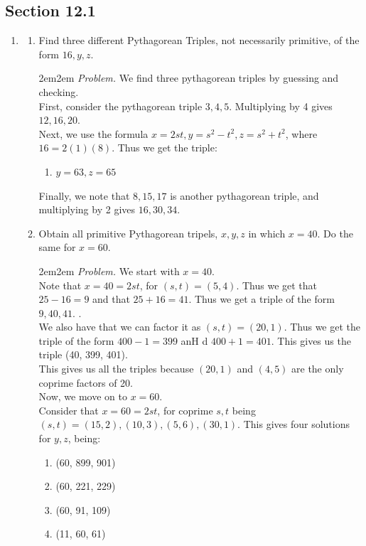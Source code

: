 \documentclass[10pt,oneside]{book}
\newcommand{\gspc}{\vspace{0.13cm}} %
\newcommand{\gline}{\gspc\\} %
\let\endoldproof\endproof
\newenvironment{problem}[1]
  {\vspace{-0.1cm}\begin{coloredadjust}\begin{adjustwidth}{2em}{2em}
   \textit{Problem. }#1}
  {\endoldproof
\end{adjustwidth}\end{coloredadjust}\gspc}
\begin{document}
\newcommand{\cg}[1]{\color{OliveGreen}#1\color{white}}
\newcommand{\cb}[1]{\color{BlueViolet}#1\color{white}}

\subsection*{Section 12.1}
\begin{enumerate}
  \item \begin{enumerate}
    \item Find three different Pythagorean Triples, not necessarily primitive, of the form $16, y,z$. 
    \begin{problem}
      We find three pythagorean triples by guessing and checking.\gline
      First, consider the pythagorean triple $3, 4, 5$. Multiplying by 4 gives $12, 16, 20$. \\
      Next, we use the formula $x=2st, y=s^2-t^2, z= s^2 +t^2$, where $16=2(1)(8)$. Thus we get the triple:
      \begin{enumerate}
        \item $y = 63, z=65$
      \end{enumerate}
      Finally, we note that $8, 15, 17$ is another pythagorean triple, and multiplying by 2 gives $16, 30, 34$. 
    \end{problem}
    \item Obtain all primitive Pythagorean tripels, $x, y, z$ in which $x = 40$. Do the same for $x = 60$.
    \begin{problem}
      We start with $x = 40$.\gline
      Note that $x = 40 = 2st$,  for $(s,t) = (5,4)$. Thus we get that $25 - 16 = 9$ and that $25 + 16=41$. Thus we get a triple of the form $9, 40, 41$. .\gline
      We also have that we can factor it as $(s,t)=(20, 1)$. Thus we get the triple of the form $400 -1 = 399$ anH d $400+1=401$. This gives us the triple (40, 399, 401).\gline
      This gives us all the triples because $(20,1)$ and $(4,5)$ are the only coprime factors of 20. \gline
      Now, we move on to $x = 60$.\gline
      Consider that $x = 60 = 2st$, for coprime $s,t$ being $(s,t)=(15,2), (10, 3), (5, 6), (30,1)$. This gives four solutions for $y, z$, being:
      \begin{enumerate}
        \item (60, 899, 901)
        \item (60, 221, 229)
        \item (60, 91, 109)
        \item (11, 60, 61)

\end{enumerate}
\end{problem}
\end{enumerate}
\end{enumerate}
\end{document}
